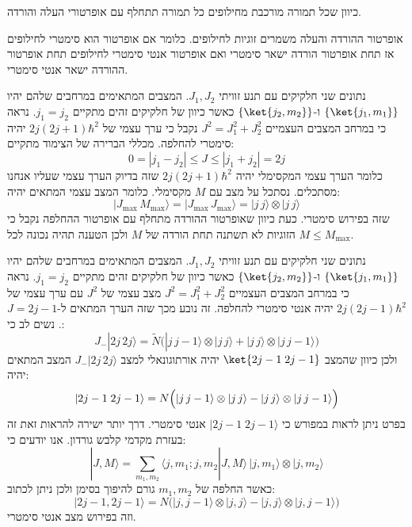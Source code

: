 \documentclass{tstextbook}
\begin{document}
\begin{corollary}
כיוון שכל תמורה מורכבת מחילופים כל תמורה תתחלף עם אופרטורי העלה והורדה.

\end{corollary}
\begin{corollary}
אופרטור ההורדה והעלה משמרים זוגיות לחילופים. כלומר אם אופרטור הוא סימטרי לחילופים אז תחת אופרטור הורדה ישאר סימטרי ואם אופרטור אנטי סימטרי לחילופים תחת אופרטור ההורדה ישאר אנטי סימטרי.

\end{corollary}
\begin{example}
נתונים שני חלקיקים עם תנע זוויתי \(J_{1},J_{2}\). המצבים המתאימים במרחבים שלהם יהיו \(\left\{  \ket{j_{1},m_{1}}  \right\}\) ו-\(\left\{  \ket{j_{2},m_{2}}  \right\}\) כאשר כיוון של חלקיקים זהים מתקיים \(j_{1}=j_{2}\). נראה כי במרחב המצבים העצמיים \(J^{2}=J_{1}^{2}+J_{2}^{2}\) נקבל כי ערך עצמי של \(2j(2j+1)\hbar^{2}\) יהיה סימטרי להחלפה. מכללי הברירה של הצימוד מתקיים:
$$0=|j_{1}-j_{2}|\leq J\leq |j_{1}+j_{2}|=2j$$
כלומר הערך עצמי המקסימלי יהיה \(2j(2j+1)\hbar^{2}\) שזה בדיוק הערך עצמי שעליו אנחנו מסתכלים. נסתכל על מצב עם \(M\) מקסימלי. כלומר המצב עצמי המתאים יהיה:
$$|J_{\mathrm{max}}\,M_{\mathrm{max}}\rangle=|J_{\mathrm{max}}\,J_{\mathrm{max}}\rangle=|j\,j\rangle\otimes|j\,j\rangle $$
שזה בפירוש סימטרי. כעת כיוון שאופרטור ההורדה מתחלף עם אופרטור ההחלפה נקבל כי הזוגיות לא תשתנה תחת הורדה של \(M\) ולכן הטענה תהיה נכונה לכל \(M\leq M_{\max}\).

\end{example}
\begin{example}
נתונים שני חלקיקים עם תנע זוויתי \(J_{1},J_{2}\). המצבים המתאימים במרחבים שלהם יהיו \(\left\{  \ket{j_{1},m_{1}}  \right\}\) ו-\(\left\{  \ket{j_{2},m_{2}}  \right\}\) כאשר כיוון של חלקיקים זהים מתקיים \(j_{1}=j_{2}\). נראה כי במרחב המצבים העצמיים \(J^{2}=J_{1}^{2}+J_{2}^{2}\) מצב עצמי של \(J^{2}\) עם ערך עצמי של \(2j(2j-1)\hbar^{2}\) יהיה אנטי סימטרי להחלפה. זה נובע מכך שזה הערך  המתאים ל-\(J=2j-1\). נשים לב כי:
$$J_{-}|2j\,2j\rangle=\tilde{N}\Big(|j\,j-1\rangle\otimes|j\,j\rangle+|j\,j\rangle\otimes|j\,j-1\rangle\Big)$$
ולכן כיוון שהמצב \(\ket{2j-1\;2j-1}\) יהיה אורתוגונאלי למצב \(J_{-}|2j\,2j\rangle\) המצב המתאים יהיה:
$$|2j-1\;2j-1\rangle=N{\Bigl(}|j\,j-1\rangle\otimes|j\,j\rangle-|j\,j\rangle\otimes|j\,j-1\rangle{\Bigr)}$$
בפרט ניתן לראות במפורש כי \(|2j-1\;2j-1\rangle\) אנטי סימטרי. דרך יותר ישירה להראות זאת זה בעזרת מקדמי קלבש גורדון. אנו יודעים כי:
$$|J,M\rangle=\sum_{m_{1},m_{2}}\langle j,m_{1};j,m_{2}|J,M\rangle\,|j,m_{1}\rangle\otimes|j,m_{2}\rangle$$
כאשר החלפה של \(m_{1},m_{2}\) גורם להיפוך בסימן ולכן ניתן לכתוב:
$$|2j-1,2j-1\rangle=N{\Big(}|j,j-1\rangle\otimes|j,j\rangle-|j,j\rangle\otimes|j,j-1\rangle{\Big)}$$
וזה בפירוש מצב אנטי סימטרי.

\end{example}
\end{document}

